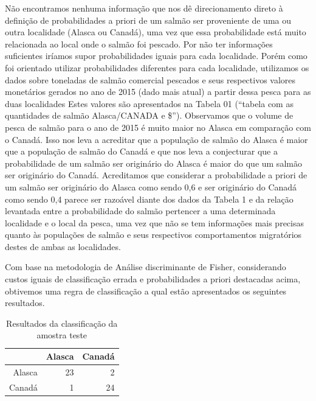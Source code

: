 \documentclass[10pt,portuguese,]{article}
\begin{document}
Não encontramos nenhuma informação que nos dê direcionamento direto à
definição de probabilidades a priori de um salmão ser proveniente de uma
ou outra localidade (Alasca ou Canadá), uma vez que essa probabilidade
está muito relacionada ao local onde o salmão foi pescado. Por não ter
informações suficientes iríamos supor probabilidades iguais para cada
localidade. Porém como foi orientado utilizar probabilidades diferentes
para cada localidade, utilizamos os dados sobre toneladas de salmão
comercial pescados e seus respectivos valores monetários gerados no ano
de 2015 (dado mais atual) a partir dessa pesca para as duas localidades
Estes valores são apresentados na Tabela 01 (``tabela com as quantidades
de salmão Alasca/CANADA e \$''). Observamos que o volume de pesca de
salmão para o ano de 2015 é muito maior no Alasca em comparação com o
Canadá. Isso nos leva a acreditar que a população de salmão do Alasca é
maior que a população de salmão do Canadá e que nos leva a conjecturar
que a probabilidade de um salmão ser originário do Alasca é maior do que
um salmão ser originário do Canadá. Acreditamos que considerar a
probabilidade a priori de um salmão ser originário do Alasca como sendo
0,6 e ser originário do Canadá como sendo 0,4 parece ser razoável diante
dos dados da Tabela 1 e da relação levantada entre a probabilidade do
salmão pertencer a uma determinada localidade e o local da pesca, uma
vez que não se tem informações mais precisas quanto às populações de
salmão e seus respectivos comportamentos migratórios destes de ambas as
localidades.

Com base na metodologia de Análise discriminante de Fisher, considerando
custos iguais de classificação errada e probabilidades a priori
destacadas acima, obtivemos uma regra de classificação a qual estão
apresentados os seguintes resultados.

\vspace{0.5cm}

\vspace{0.5cm}

\begin{table}[ht]
\centering
\caption{Resultados da classificação da amostra teste}
\bgroup
\def\arraystretch{1.5}
\begin{tabular}{rrr}
\toprule
& Alasca & Canadá \\ \midrule
\hline
Alasca & 23 & 2 \\
Canadá & 1 & 24 \\ \bottomrule
\hline
\end{tabular}
\egroup
\end{table}
\end{document}

